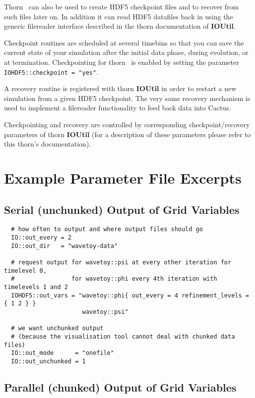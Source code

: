 \documentclass{article}
\begin{document}
Thorn \ThisThorn\ can also be used to create HDF5 checkpoint files and
to recover from such files later on. In addition it can read HDF5 datafiles
back in using the generic filereader interface described in the thorn
documentation of {\bf IOUtil}.

Checkpoint routines are scheduled at several timebins so that you can save
the current state of your simulation after the initial data phase,
during evolution, or at termination. Checkpointing for thorn \ThisThorn\ 
is enabled by setting the parameter {\tt IOHDF5::checkpoint = "yes"}.

A recovery routine is registered with thorn {\bf IOUtil} in order to restart
a new simulation from a given HDF5 checkpoint.
The very same recovery mechanism is used to implement a filereader
functionality to feed back data into Cactus.

Checkpointing and recovery are controlled by corresponding checkpoint/recovery
parameters of thorn {\bf IOUtil} (for a description of these parameters please
refer to this thorn's documentation).


\section{Example Parameter File Excerpts}

\subsection{Serial (unchunked) Output of Grid Variables}

\begin{verbatim}
  # how often to output and where output files should go
  IO::out_every = 2
  IO::out_dir   = "wavetoy-data"

  # request output for wavetoy::psi at every other iteration for timelevel 0,
  #                for wavetoy::phi every 4th iteration with timelevels 1 and 2
  IOHDF5::out_vars = "wavetoy::phi{ out_every = 4 refinement_levels = { 1 2 } }
                      wavetoy::psi"

  # we want unchunked output
  # (because the visualisation tool cannot deal with chunked data files)
  IO::out_mode      = "onefile"
  IO::out_unchunked = 1
\end{verbatim}

\subsection{Parallel (chunked) Output of Grid Variables}
\end{document}
